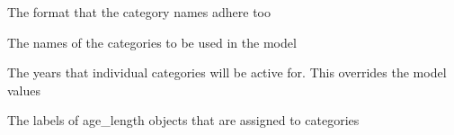 
 {The format that the category names adhere too}

 {The names of the categories to be used in the model}

 {The years that individual categories will be active for. This overrides the model values}

 {The labels of age\_length objects that are assigned to categories}

